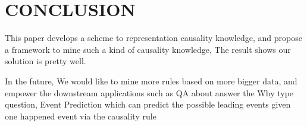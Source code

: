 \section{CONCLUSION}
\label{sec:conclusion}

This paper develops a scheme to representation causality knowledge, and propose a framework to mine such a kind of causality knowledge, The result shows our solution is pretty well.

In the future, We would like to mine more rules based on more bigger data, and empower the downstream applications such as QA about answer the Why type question, Event Prediction which can predict the possible leading events given one happened event via the causality rule